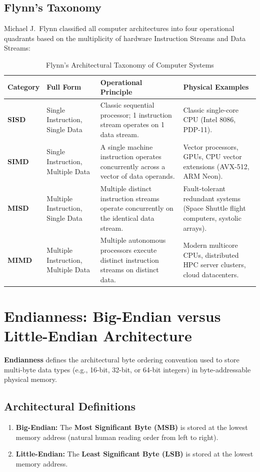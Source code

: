 \subsection{Flynn's Taxonomy}
Michael J.~Flynn classified all computer architectures into four operational quadrants based on the multiplicity of hardware Instruction Streams and Data Streams:

\begin{table}[htbp]
\centering
\small
\caption{Flynn's Architectural Taxonomy of Computer Systems}
\label{tab:flynns_taxonomy}
\begin{tabularx}{\textwidth}{l l X X}
\toprule
\textbf{Category} & \textbf{Full Form} & \textbf{Operational Principle} & \textbf{Physical Examples} \\
\midrule
\textbf{SISD} & Single Instruction, Single Data & Classic sequential processor; 1 instruction stream operates on 1 data stream. & Classic single-core CPU (Intel 8086, PDP-11). \\
\textbf{SIMD} & Single Instruction, Multiple Data & A single machine instruction operates concurrently across a vector of data operands. & Vector processors, GPUs, CPU vector extensions (AVX-512, ARM Neon). \\
\textbf{MISD} & Multiple Instruction, Single Data & Multiple distinct instruction streams operate concurrently on the identical data stream. & Fault-tolerant redundant systems (Space Shuttle flight computers, systolic arrays). \\
\textbf{MIMD} & Multiple Instruction, Multiple Data & Multiple autonomous processors execute distinct instruction streams on distinct data. & Modern multicore CPUs, distributed HPC server clusters, cloud datacenters. \\
\bottomrule
\end{tabularx}
\end{table}


\section{Endianness: Big-Endian versus Little-Endian Architecture}
\label{sec:endianness}

\textbf{Endianness} defines the architectural byte ordering convention used to store multi-byte data types (e.g., 16-bit, 32-bit, or 64-bit integers) in byte-addressable physical memory.

\subsection{Architectural Definitions}
\begin{enumerate}[label=\bfseries\arabic*.]
    \item \textbf{Big-Endian:} The \textbf{Most Significant Byte (MSB)} is stored at the lowest memory address (natural human reading order from left to right).
    \item \textbf{Little-Endian:} The \textbf{Least Significant Byte (LSB)} is stored at the lowest memory address.
\end{enumerate}

